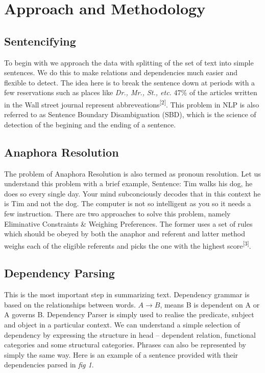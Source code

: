 \documentclass[conference]{IEEEtran}
\begin{document}
\section{Approach and Methodology}

\subsection{Sentencifying}
To begin with we approach the data with splitting of the set of text into simple sentences.
We do this to make relations and dependencies much easier and flexible to detect. The idea here is to break the sentence down at periods with a few reservations such as places like \textit{Dr., Mr., St., etc.} 47\% of the articles written in the Wall street journal represent abbreveations\textsuperscript{[2]}. This problem in NLP is also referred to as Sentence Boundary Disambiguation (SBD), which is the science of detection of the begining and the ending of a sentence.

\subsection{Anaphora Resolution}
The problem of Anaphora Resolution is also termed as pronoun resolution. Let us understand this problem with a brief example, Sentence: Tim walks his dog, he does so every single day. Your mind subconciously decodes that in this context he is Tim and not the dog. The computer is not so intelligent as you so it needs a few instruction. There are two approaches to solve this problem, namely Eliminative Constraints \& Weighing Preferences. The former uses a set of rules which should be obeyed by both the anaphor and referent and latter method weighs each of the eligible referents and picks the one with the highest score\textsuperscript{[3]}.

\subsection{Dependency Parsing}
This is the most important step in summarizing text. Dependency grammar is based on the relationships between words. $A \rightarrow B$, means B is dependent on A or A governs B. Dependency Parser is simply used to realise the predicate, subject and object in a particular context. We can understand a simple selection of dependency by expressing the structure in head -- dependent relation, functional categories and some structural categories. Phrases can also be represented by simply the same way. Here is an example of a sentence provided with their dependencies parsed in \textit{fig 1}.
\end{document}
